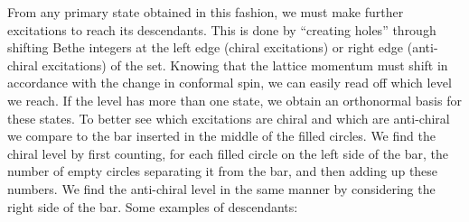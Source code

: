 \documentclass[a4paper,10pt]{article}
\newcommand{\linnea}[1]{$\framebox{\tiny L}$\ \textbf{\texttt{{\color{red}\footnotesize#1}}}}
\newcommand{\jesper}[1]{$\framebox{\tiny J}$\ \textbf{\texttt{{\color{cyan}\footnotesize#1}}}}
\begin{document}
From any primary state obtained in this fashion, we must make further excitations to reach its descendants. This is done by ``creating holes'' through shifting Bethe integers at the left edge (chiral excitations) or right edge (anti-chiral excitations) of the set. Knowing that the lattice momentum must shift in accordance with the change in conformal spin, we can easily read off which level we reach. If the level has more than one state, we obtain an orthonormal basis for these states.
To better see which excitations are chiral and which are anti-chiral we compare to the bar inserted in the middle of the filled circles. We find the chiral level by first counting, for each filled circle on the left side of the bar, the number of empty circles separating it from the bar, and then adding up these numbers. We find the anti-chiral level in the same manner by considering the right side of the bar. Some examples of descendants:
%
\end{document}
